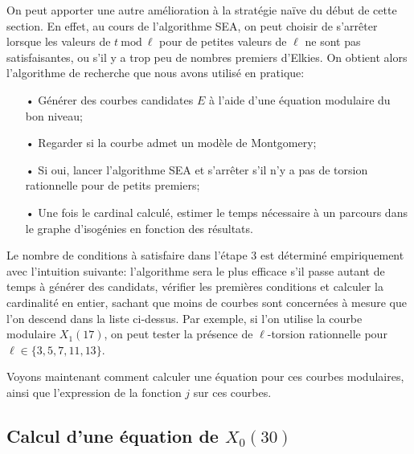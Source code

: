 \documentclass[11pt,a4paper]{article}
\renewcommand{\mod}{\ \mathrm{mod}\ }
\renewcommand{\v}{\vspace{5mm}}
\theoremstyle{definition}
\begin{document}
\v
On peut apporter une autre amélioration à la stratégie naïve du début de cette section. En effet, au cours de l'algorithme SEA, on peut choisir de s'arrêter lorsque les valeurs de $t \mod \ell$ pour de petites valeurs de $\ell$ ne sont pas satisfaisantes, ou s'il y a trop peu de nombres premiers d'Elkies. On obtient alors l'algorithme de recherche que nous avons utilisé en pratique:
\begin{itemize}
\item[•] Générer des courbes candidates $E$ à l'aide d'une équation modulaire du bon niveau;
\item[•] Regarder si la courbe admet un modèle de Montgomery;
\item[•] Si oui, lancer l'algorithme SEA et s'arrêter s'il n'y a pas de torsion rationnelle pour de petits premiers;
\item[•] Une fois le cardinal calculé, estimer le temps nécessaire à un parcours dans le graphe d'isogénies en fonction des résultats.
\end{itemize}

Le nombre de conditions à satisfaire dans l'étape 3 est déterminé empiriquement avec l'intuition suivante: l'algorithme sera le plus efficace s'il passe autant de temps à générer des candidats, vérifier les premières conditions et calculer la cardinalité en entier, sachant que moins de courbes sont concernées à mesure que l'on descend dans la liste ci-dessus. Par exemple, si l'on utilise la courbe modulaire $X_1(17)$,
on peut tester la présence de $\ell$-torsion rationnelle pour $\ell\in\{3, 5, 7, 11, 13\}$.

\v

Voyons maintenant comment calculer une équation pour ces courbes modulaires, ainsi que l'expression de la fonction $j$ sur ces courbes.

\subsection{Calcul d'une équation de $X_0(30)$}
\end{document}
